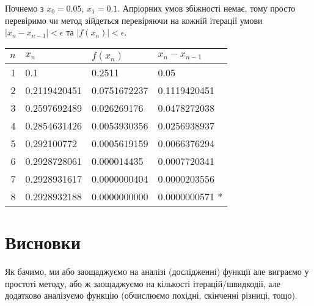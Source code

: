 Почнемо з $x_0 = 0.05$, $x_1 = 0.1$. Апріорних умов збіжності немає, тому просто перевіримо чи метод зійдеться перевіряючи на кожній ітерації умови $|x_n - x_{n-1}| < \epsilon$ та $|f(x_n)| < \epsilon$.
\begin{table}[H]
    \centering
    \begin{tabular}{|r|l|l|l|}
        \hline
        $n$ & $x_n$ & $f(x_n)$ & $x_n - x_{n-1}$ \\ \hline
        1 & 0.1          & 0.2511       & 0.05           \\
        2 & 0.2119420451 & 0.0751672237 & 0.1119420451   \\
        3 & 0.2597692489 & 0.026269176  & 0.0478272038   \\
        4 & 0.2854631426 & 0.0053930356 & 0.0256938937   \\
        5 & 0.292100772  & 0.0005619159 & 0.0066376294   \\
        6 & 0.2928728061 & 0.000014435  & 0.0007720341   \\
        7 & 0.2928931617 & 0.0000000404 & 0.0000203556   \\
        8 & 0.2928932188 & 0.0000000000 & 0.0000000571 * \\ \hline
    \end{tabular}
\end{table}

\section{Висновки}

Як бачимо, ми або заощаджуємо на аналізі (дослідженні) функції але виграємо у простоті методу, або ж заощаджуємо на кількості ітерацій/швидкодії, але додатково аналізуємо функцію (обчислюємо похідні, скінченні різниці, тощо).


